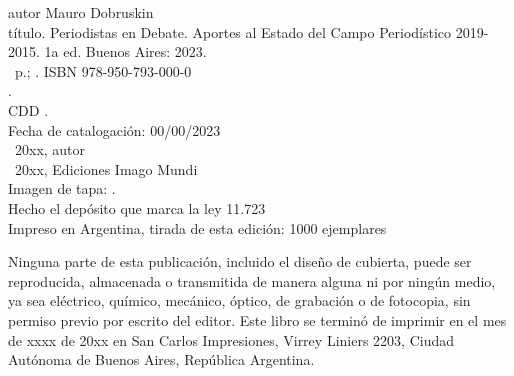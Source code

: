 \noindent autor Mauro Dobruskin \\
\noindent título. Periodistas en Debate. Aportes al Estado del Campo Periodístico 2019-2015. 1a ed. Buenos Aires: 2023.\\
\noindent \ztotpages\ p.; \valorEspecifico. ISBN 978-950-793-000-0 \\
. \\
\noindent CDD .\\
\noindent Fecha de catalogación: 00/00/2023 \\
\noindent \textcopyright~20xx, autor \\
\noindent \textcopyright~20xx, Ediciones Imago Mundi\\
\noindent Imagen de tapa: .\\
\noindent Hecho el depósito que marca la ley 11.723\\
\noindent Impreso en Argentina, tirada de esta edición: 1000 ejemplares\\

\vfill

\noindent {}\bigskip

\noindent Ninguna parte de esta publicación, incluido el diseño de cubierta, puede ser reproducida, almacenada o transmitida de manera alguna ni por ningún medio, ya sea eléctrico, químico, mecánico, óptico, de grabación o de fotocopia, sin permiso previo por escrito del editor. Este libro se terminó de imprimir en el mes de xxxx de 20xx en San Carlos Impresiones, Virrey Liniers 2203, Ciudad Autónoma de Buenos Aires, República Argentina.

